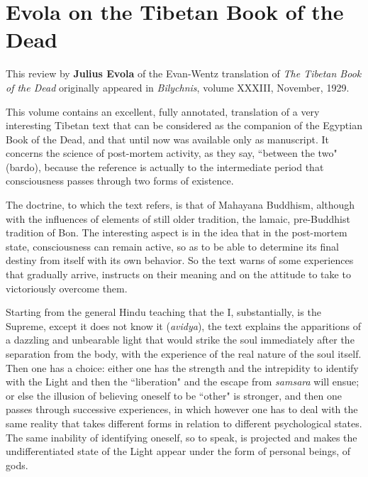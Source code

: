 \section{Evola on the Tibetan Book of the Dead}
\label{sec:EvolaTibetanDead}

\begin{quotex}
This review by \textbf{Julius Evola} of the Evan-Wentz translation of \textit{The Tibetan Book of the Dead} originally appeared in \textit{Bilychnis}, volume XXXIII, November, 1929. 
\end{quotex}

This volume contains an excellent, fully annotated, translation of a very interesting Tibetan text that can be considered as the companion of the Egyptian Book of the Dead, and that until now was available only as manuscript. It concerns the science of post-mortem activity, as they say, ``between the two" (bardo), because the reference is actually to the intermediate period that consciousness passes through two forms of existence.

The doctrine, to which the text refers, is that of Mahayana Buddhism, although with the influences of elements of still older tradition, the lamaic, pre-Buddhist tradition of Bon. The interesting aspect is in the idea that in the post-mortem state, consciousness can remain active, so as to be able to determine its final destiny from itself with its own behavior. So the text warns of some experiences that gradually arrive, instructs on their meaning and on the attitude to take to victoriously overcome them.

Starting from the general Hindu teaching that the I, substantially, is the Supreme, except it does not know it (\emph{avidya}), the text explains the apparitions of a dazzling and unbearable light that would strike the soul immediately after the separation from the body, with the experience of the real nature of the soul itself. Then one has a choice: either one has the strength and the intrepidity to identify with the Light and then the ``liberation" and the escape from \emph{samsara} will ensue; or else the illusion of believing oneself to be ``other" is stronger, and then one passes through successive experiences, in which however one has to deal with the same reality that takes different forms in relation to different psychological states. The same inability of identifying oneself, so to speak, is projected and makes the undifferentiated state of the Light appear under the form of personal beings, of gods.

